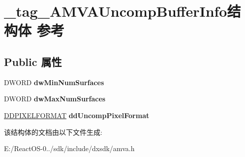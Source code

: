 \hypertarget{struct__tag___a_m_v_a_uncomp_buffer_info}{}\section{\+\_\+tag\+\_\+\+A\+M\+V\+A\+Uncomp\+Buffer\+Info结构体 参考}
\label{struct__tag___a_m_v_a_uncomp_buffer_info}
\subsection*{Public 属性}
\begin{DoxyCompactItemize}
\item 
\mbox{\label{struct__tag___a_m_v_a_uncomp_buffer_info_a7b7da3fa9fff7e43e09e2fad19596e6a}} 
D\+W\+O\+RD {\bfseries dw\+Min\+Num\+Surfaces}
\item 
\mbox{\label{struct__tag___a_m_v_a_uncomp_buffer_info_a06dee7250e15fa6e6797b7429ab64336}} 
D\+W\+O\+RD {\bfseries dw\+Max\+Num\+Surfaces}
\item 
\mbox{\label{struct__tag___a_m_v_a_uncomp_buffer_info_a77de757a7b7cb4b4a07a8c9857183b76}} 
\hyperlink{struct___d_d_p_i_x_e_l_f_o_r_m_a_t}{D\+D\+P\+I\+X\+E\+L\+F\+O\+R\+M\+AT} {\bfseries dd\+Uncomp\+Pixel\+Format}
\end{DoxyCompactItemize}


该结构体的文档由以下文件生成\+:\begin{DoxyCompactItemize}
\item 
E\+:/\+React\+O\+S-\/0../sdk/include/dxsdk/amva.\+h\end{DoxyCompactItemize}
